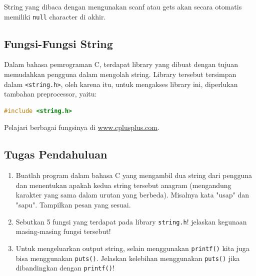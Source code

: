 String yang dibaca dengan mengunakan scanf atau gets akan secara otomatis memiliki \verb|null| character di akhir.

\subsection{Fungsi-Fungsi String}
Dalam bahasa pemrograman C, terdapat library yang dibuat dengan tujuan memudahkan pengguna dalam mengolah string.
Library tersebut tersimpan dalam \verb|<string.h>|,
oleh karena itu, untuk mengakses library ini, diperlukan tambahan preprocessor, yaitu:
\begin{lstlisting}[language=c]
	#include <string.h>
\end{lstlisting}

Pelajari berbagai fungsinya di \href{http://www.cplusplus.com/}{www.cplusplus.com}.

\subsection{Tugas Pendahuluan}
\begin{enumerate}
	\item Buatlah program dalam bahasa C yang mengambil dua string dari pengguna dan menentukan apakah kedua string tersebut anagram (mengandung karakter yang sama dalam urutan yang berbeda).
		  Misalnya kata "usap" dan "sapu".
	      Tampilkan pesan yang sesuai.
	\item Sebutkan 5 fungsi yang terdapat pada library \verb|string.h|! jelaskan kegunaan masing-masing fungsi tersebut!
	\item Untuk mengeluarkan output string, selain menggunakan \verb|printf()| kita juga bisa menggunakan \verb|puts()|. Jelaskan kelebihan menggunakan \verb|puts()| jika dibandingkan dengan \verb|printf()|!
\end{enumerate}